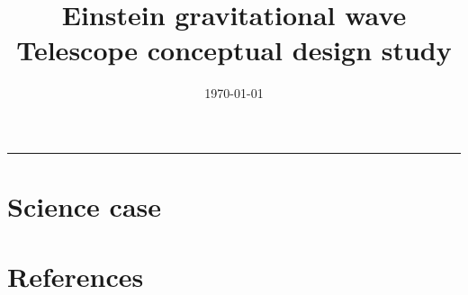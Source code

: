 \documentclass[color,DIV12,pdftex,a4paper]{ET-DS}
\title{Einstein gravitational wave Telescope conceptual design study} \shorttitle{ET Design Study}
\date{\today}
\begin{document}
%
\begin{titlepage}
\maketitle
\end{titlepage}
\clearpage
%
\FloatBarrier
%
\vspace{1cm}
\setcounter{page}{4}
%
{\setlength{\baselineskip}{0pt} \tableofcontents}
\vspace{1cm}
\hrule height 1pt
\clearpage


\printnomenclature[0.75in] 
\newpage 

\citeindextrue
\FloatBarrier
\section{Science case}




\FloatBarrier
\section*{References}
{}
 
\end{document}
